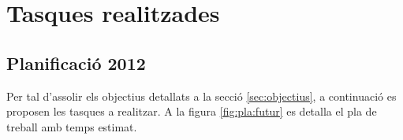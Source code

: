 \section{Tasques realitzades}






\subsection{Planificació 2012}


Per tal d'assolir els objectius detallats a la secció
\ref{sec:objectius}, a continuació es proposen les tasques a
realitzar.  A la figura \ref{fig:pla:futur} es detalla el pla de
treball amb temps estimat.





